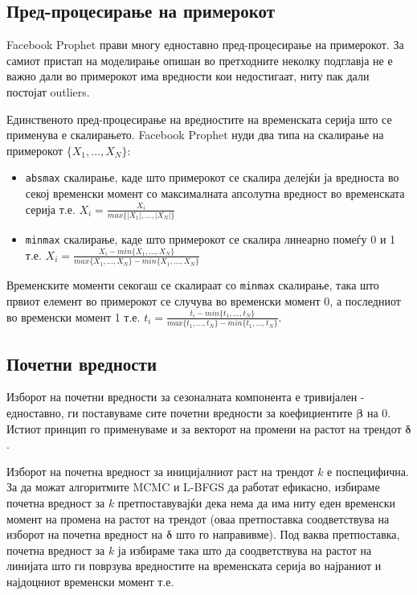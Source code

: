 \documentclass[12pt]{article}
\numberwithin{equation}{section}
\begin{document}
\subsection{Пред-процесирање на примерокот}

Facebook Prophet прави многу едноставно пред-процесирање на примерокот. За самиот пристап на моделирање опишан во претходните неколку подглавја не е важно дали во примерокот има вредности кои недостигаат, ниту пак дали постојат outliers.

Единственото пред-процесирање на вредностите на временската серија што се применува е скалирањето. Facebook Prophet нуди два типа на скалирање на примерокот \(\{X_{1}, ..., X_{N}\}\):
\begin{itemize}
    \item \verb|absmax| скалирање, каде што примерокот се скалира делејќи ја вредноста во секој временски момент со максималната апсолутна вредност во временската серија т.е. \(X_{i}=\frac{X_{i}}{max\{|X_{1}|, ..., |X_{N}|\}}\)
    \item \verb|minmax| скалирање, каде што примерокот се скалира линеарно помеѓу 0 и 1 т.е. \(X_{i}=\frac{X_{i} - min\{X_{1}, ..., X_{N}\}}{max\{X_{1}, ..., X_{N}\} - min\{X_{1}, ..., X_{N}\}}\)
\end{itemize}

Временските моменти секогаш се скалираат со \verb|minmax| скалирање, така што првиот елемент во примерокот се случува во временски момент 0, а последниот во временски момент 1 т.е. \(t_{i}=\frac{t_{i} - min\{t_{1}, ..., t_{N}\}}{max\{t_{1}, ..., t_{N}\} - min\{t_{1}, ..., t_{N}\}}\).

\subsection{Почетни вредности}

Изборот на почетни вредности за сезоналната компонента е тривијален - едноставно, ги поставуваме сите почетни вредности за коефициентите \(\boldsymbol{\beta}\) на 0. Истиот принцип го применуваме и за векторот на промени на растот на трендот \(\boldsymbol{\delta}\).

Изборот на почетна вредност за иницијалниот раст на трендот \(k\) е поспецифична. За да можат алгоритмите MCMC и L-BFGS да работат ефикасно, избираме почетна вредност за \(k\) претпоставувајќи дека нема да има ниту еден временски момент на промена на растот на трендот (оваа претпоставка соодветствува на изборот на почетна вредност на \(\boldsymbol{\delta}\) што го направивме). Под ваква претпоставка, почетна вредност за \(k\) ја избираме така што да соодветствува на растот на линијата што ги поврзува вредностите на временската серија во најраниот и најдоцниот временски момент т.е.
\end{document}
